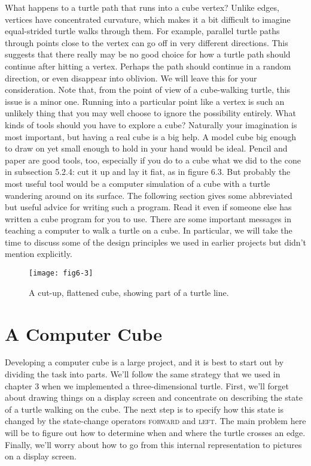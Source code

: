 \documentclass{book}
\begin{document}
What happens to a turtle path that runs into a cube vertex? Unlike
edges, vertices have concentrated curvature, which makes it a bit difficult
to imagine equal-strided turtle walks through them. For example, parallel turtle paths through points close to the vertex can go off in very
different directions. This suggests that there really may be no good
choice for how a turtle path should continue after hitting a vertex.
Perhaps the path should continue in a random direction, or even disappear into oblivion. We will leave this for your consideration. Note that,
from the point of view of a cube-walking turtle, this issue is a minor
one. Running into a particular point like a vertex is such an unlikely
thing that you may well choose to ignore the possibility entirely.
What kinds of tools should you have to explore a cube? Naturally your
imagination is most important, but having a real cube is a big help. A
model cube big enough to draw on yet small enough to hold in your hand
would be ideal. Pencil and paper are good tools, too, especially if you
do to a cube what we did to the cone in subsection 5.2.4: cut it up and
lay it fiat, as in figure 6.3. But probably the most useful tool would be
a computer simulation of a cube with a turtle wandering around on its
surface. The following section gives some abbreviated but useful advice
for writing such a program. Read it even if someone else has written
a cube program for you to use. There are some important messages in
teaching a computer to walk a turtle on a cube. In particular, we will
take the time to discuss some of the design principles we used in earlier
projects but didn't mention explicitly.

\begin{figure}
\begin{center}
\texttt{[image: fig6-3]}
\caption{A cut-up, flattened cube, showing part of a turtle line.}
\end{center}
\end{figure}

\section{A Computer Cube}

Developing a computer cube is a large project, and it is best to start
out by dividing the task into parts. We'll follow the same strategy
that we used in chapter 3 when we implemented a three-dimensional
turtle. First, we'll forget about drawing things on a display screen and
concentrate on describing the state of a turtle walking on the cube. The
next step is to specify how this state is changed by the state-change
operators \textsc{forward} and \textsc{left}. The main problem here will be to figure
out how to determine when and where the turtle crosses an edge. Finally,
we'll worry about how to go from this internal representation to pictures
on a display screen.
\end{document}
